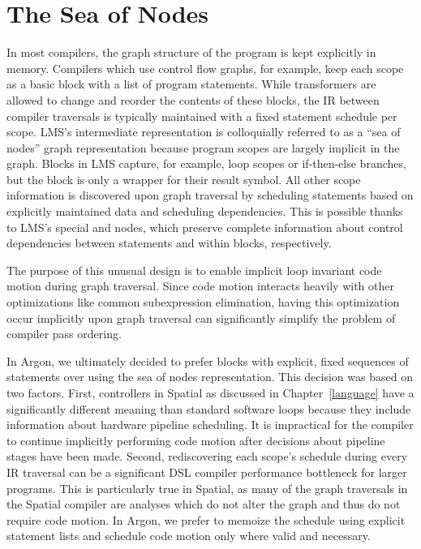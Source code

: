 \section{The Sea of Nodes}
In most compilers, the graph structure of the program is kept explicitly in memory.
Compilers which use control flow graphs, for example, keep each scope as a
basic block with a list of program statements. While transformers are allowed
to change and reorder the contents of these blocks, the IR between compiler traversals is
typically maintained with a fixed statement schedule per scope.
LMS's intermediate representation is colloquially referred to as
a ``sea of nodes'' graph representation because program scopes are largely
implicit in the graph. Blocks in LMS capture, for example, loop scopes or
if-then-else branches, but the block is only a wrapper for their result symbol.
All other scope information is discovered upon graph traversal by scheduling
statements based on explicitly maintained data and scheduling dependencies.
This is possible thanks to LMS's special  and  nodes, which
preserve complete information about control dependencies between statements and
within blocks, respectively.

The purpose of this unusual design is to enable implicit loop invariant
code motion during graph traversal. Since code motion interacts heavily with
other optimizations like common subexpression elimination, having this
optimization occur implicitly upon graph traversal can significantly simplify
the problem of compiler pass ordering.

In Argon, we ultimately decided to prefer blocks with explicit, fixed sequences of
statements over using the sea of nodes representation. This decision was based on
two factors. First, controllers in Spatial as discussed in Chapter~\ref{language}
have a significantly different meaning than standard software loops because they
include information about hardware pipeline scheduling. It is
impractical for the compiler to continue implicitly performing code motion
after decisions about pipeline stages have been made. Second, rediscovering each
scope's schedule during every IR traversal can be a significant
DSL compiler performance bottleneck for larger programs. This is particularly true in
Spatial, as many of the graph traversals in the Spatial
compiler are analyses which do not alter the graph and thus do not require code motion.
In Argon, we prefer to memoize the
schedule using explicit statement lists and schedule code motion only where valid and necessary.

